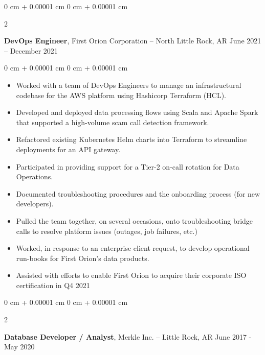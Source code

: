 \documentclass[10pt, letterpaper]{article}
\newenvironment{highlights}{
    \begin{itemize}[
        topsep=0.10 cm,
        parsep=0.10 cm,
        partopsep=0pt,
        itemsep=0pt,
        leftmargin=0 cm + 10pt
    ]
}{
    \end{itemize}
} %
\newenvironment{onecolentry}{
    \begin{adjustwidth}{
        0 cm + 0.00001 cm
    }{
        0 cm + 0.00001 cm
    }
}{
    \end{adjustwidth}
} %
\newenvironment{twocolentry}[2][]{
    \onecolentry
    \def\secondColumn{#2}
    \setcolumnwidth{\fill, 4.5 cm}
    \begin{paracol}{2}
}{
    \switchcolumn \raggedleft \secondColumn
    \end{paracol}
    \endonecolentry
} %
\begin{document}
        \vspace{0.75 cm}

        \begin{twocolentry}{
            June 2021 – December 2021
        }
        \textbf{DevOps Engineer}, First Orion Corporation -- North Little Rock, AR \end{twocolentry}

        \vspace{0.10 cm}
        
        \begin{onecolentry}
            \begin{highlights}
            \item Worked with a team of DevOps Engineers to manage an infrastructural codebase for the AWS platform using Hashicorp Terraform (HCL).
            \item Developed and deployed data processing flows using Scala and Apache Spark that supported a high-volume scam call detection framework.
            \item Refactored existing Kubernetes Helm charts into Terraform to streamline deployments for an API gateway.
            \item Participated in providing support for a Tier-2 on-call rotation for Data Operations.
            \item Documented troubleshooting procedures and the onboarding process (for new developers).
            \item Pulled the team together, on several occasions, onto troubleshooting bridge calls to resolve platform issues (outages, job failures, etc.)
            \item Worked, in response to an enterprise client request, to develop operational run-books for First Orion’s data products.
            \item Assisted with efforts to enable First Orion to acquire their corporate ISO certification in Q4 2021
            \end{highlights}
        \end{onecolentry}

        \vspace{0.75 cm}
        \begin{twocolentry}{
            June 2017 - May 2020
        }
            \textbf{Database Developer / Analyst}, Merkle Inc. -- Little Rock, AR\end{twocolentry}
\end{document}
